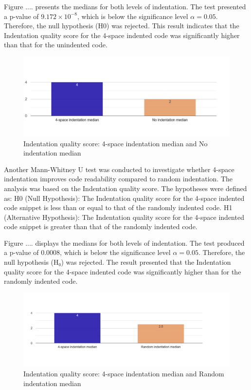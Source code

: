 Figure .... presents the medians for both levels of indentation. The test presented a p-value of \(9.172 \times 10^{-8}\), which is below the significance level \(\alpha = 0.05\). Therefore, the null hypothesis (H0) was rejected. This result indicates that the Indentation quality score for the 4-space indented code was significantly higher than that for the unindented code. 

\begin{figure} [H]
  \centering
  \includegraphics[scale=0.4]{figures/4-0-q5png.png}
  \caption{Indentation quality score: 4-space indentation median and No indentation median}
  \label{fig:AnhangsChor}
\end{figure}


Another Mann-Whitney U test was conducted to investigate whether 4-space indentation improves code readability compared to random indentation. The analysis was based on the Indentation quality score. The hypotheses were defined as:  H0 (Null Hypothesis): The Indentation quality score for the 4-space indented code snippet is less than or equal to that of the randomly indented code. H1 (Alternative Hypothesis): The Indentation quality score for the 4-space indented code snippet is greater than that of the randomly indented code.


Figure .... displays the medians for both levels of indentation. 
The test produced a p-value of 0.0008, which is below the significance level \(\alpha = 0.05\). Therefore, the null hypothesis (H₀) was rejected. The result presented that the Indentation quality score for the 4-space indented code was significantly higher than for the randomly indented code.

\begin{figure} [H]
  \centering
  \includegraphics[scale=0.4]{figures/4-r-q5.png}
  \caption{Indentation quality score: 4-space indentation median and Random indentation median}
  \label{fig:AnhangsChor}
\end{figure}


